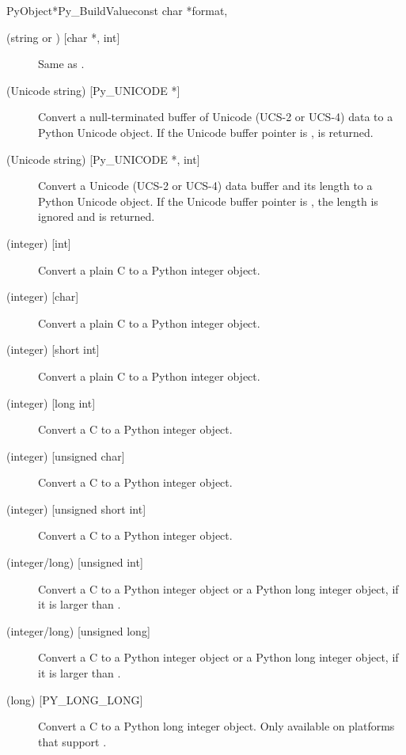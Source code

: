 \begin{cfuncdesc}{PyObject*}{Py_BuildValue}{const char *format,
                                            \moreargs}
\begin{description}
    \item[ (string or ) {[char *, int]}]
    Same as .

    \item[ (Unicode string) {[Py_UNICODE *]}]
    Convert a null-terminated buffer of Unicode (UCS-2 or UCS-4)
    data to a Python Unicode object.  If the Unicode buffer pointer
    is \NULL,  is returned.

    \item[ (Unicode string) {[Py_UNICODE *, int]}]
    Convert a Unicode (UCS-2 or UCS-4) data buffer and its length
    to a Python Unicode object.   If the Unicode buffer pointer
    is \NULL, the length is ignored and  is returned.

    \item[ (integer) {[int]}]
    Convert a plain C  to a Python integer object.

    \item[ (integer) {[char]}]
    Convert a plain C  to a Python integer object.

    \item[ (integer) {[short int]}]
    Convert a plain C  to a Python integer object.

    \item[ (integer) {[long int]}]
    Convert a C  to a Python integer object.

    \item[ (integer) {[unsigned char]}]
    Convert a C  to a Python integer object.

    \item[ (integer) {[unsigned short int]}]
    Convert a C  to a Python integer object.

    \item[ (integer/long) {[unsigned int]}]
    Convert a C  to a Python integer object
    or a Python long integer object, if it is larger than .

    \item[ (integer/long) {[unsigned long]}]
    Convert a C  to a Python integer object
    or a Python long integer object, if it is larger than .

    \item[ (long) {[PY_LONG_LONG]}]
    Convert a C  to a Python long integer object. Only
    available on platforms that support .


\end{description}
\end{cfuncdesc}
